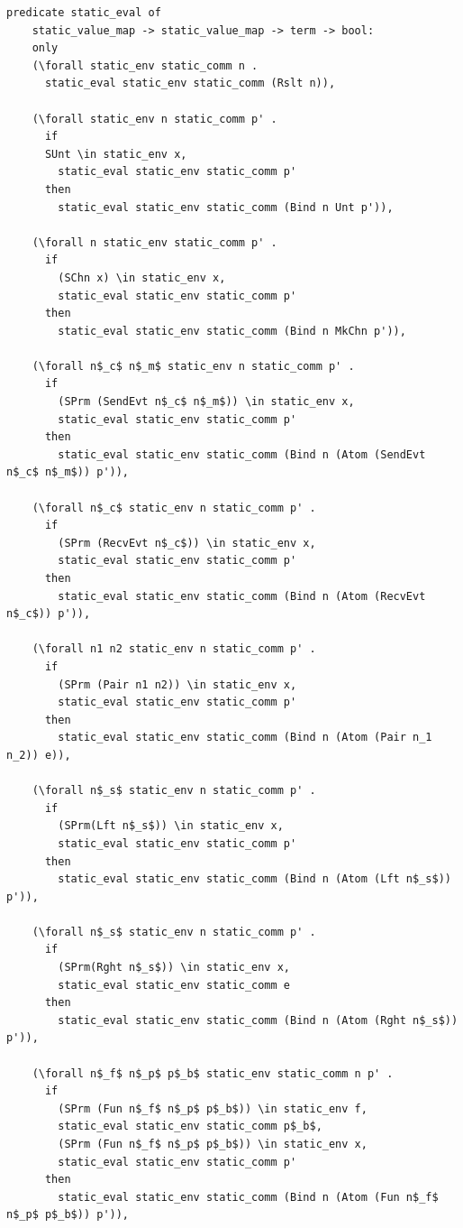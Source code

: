 \documentclass[10pt]{article}
\begin{document}
\begin{lstlisting}[language=logic, mathescape]
  predicate static_eval of
    static_value_map -> static_value_map -> term -> bool:
    only
    (\forall static_env static_comm n .
      static_eval static_env static_comm (Rslt n)),

    (\forall static_env n static_comm p' .
      if 
      SUnt \in static_env x,
        static_eval static_env static_comm p'
      then
        static_eval static_env static_comm (Bind n Unt p')),

    (\forall n static_env static_comm p' .
      if 
        (SChn x) \in static_env x,
        static_eval static_env static_comm p'
      then  
        static_eval static_env static_comm (Bind n MkChn p')),

    (\forall n$_c$ n$_m$ static_env n static_comm p' .
      if
        (SPrm (SendEvt n$_c$ n$_m$)) \in static_env x,
        static_eval static_env static_comm p' 
      then
        static_eval static_env static_comm (Bind n (Atom (SendEvt n$_c$ n$_m$)) p')),

    (\forall n$_c$ static_env n static_comm p' . 
      if 
        (SPrm (RecvEvt n$_c$)) \in static_env x,
        static_eval static_env static_comm p'
      then
        static_eval static_env static_comm (Bind n (Atom (RecvEvt n$_c$)) p')),

    (\forall n1 n2 static_env n static_comm p' .
      if
        (SPrm (Pair n1 n2)) \in static_env x,
        static_eval static_env static_comm p'
      then
        static_eval static_env static_comm (Bind n (Atom (Pair n_1 n_2)) e)),

    (\forall n$_s$ static_env n static_comm p' .
      if
        (SPrm(Lft n$_s$)) \in static_env x,
        static_eval static_env static_comm p' 
      then
        static_eval static_env static_comm (Bind n (Atom (Lft n$_s$)) p')),

    (\forall n$_s$ static_env n static_comm p' .
      if
        (SPrm(Rght n$_s$)) \in static_env x, 
        static_eval static_env static_comm e
      then
        static_eval static_env static_comm (Bind n (Atom (Rght n$_s$)) p')),

    (\forall n$_f$ n$_p$ p$_b$ static_env static_comm n p' .
      if
        (SPrm (Fun n$_f$ n$_p$ p$_b$)) \in static_env f, 
        static_eval static_env static_comm p$_b$, 
        (SPrm (Fun n$_f$ n$_p$ p$_b$)) \in static_env x, 
        static_eval static_env static_comm p'
      then
        static_eval static_env static_comm (Bind n (Atom (Fun n$_f$ n$_p$ p$_b$)) p')),


\end{lstlisting}
\end{document}
